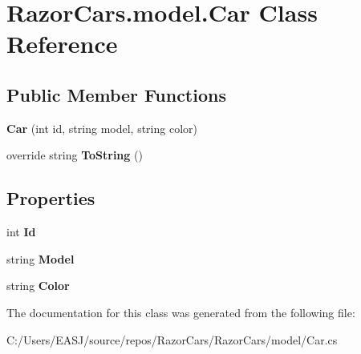 \hypertarget{class_razor_cars_1_1model_1_1_car}{}\section{Razor\+Cars.\+model.\+Car Class Reference}
\label{class_razor_cars_1_1model_1_1_car}
\subsection*{Public Member Functions}
\begin{DoxyCompactItemize}
\item 
\mbox{\label{class_razor_cars_1_1model_1_1_car_a8b5835ded0ebdb59deb31596c7bc76d0}} 
{\bfseries Car} (int id, string model, string color)
\item 
\mbox{\label{class_razor_cars_1_1model_1_1_car_a0a91577834328cd1b47ef43d2b24f696}} 
override string {\bfseries To\+String} ()
\end{DoxyCompactItemize}
\subsection*{Properties}
\begin{DoxyCompactItemize}
\item 
\mbox{\label{class_razor_cars_1_1model_1_1_car_a9d5018ab18358883dc6acb824cc9135a}} 
int {\bfseries Id}
\item 
\mbox{\label{class_razor_cars_1_1model_1_1_car_a8fed06a977dd9a8e195d73efb0080ed4}} 
string {\bfseries Model}
\item 
\mbox{\label{class_razor_cars_1_1model_1_1_car_ad46c4648039cc8c4a1265c4f693796e7}} 
string {\bfseries Color}
\end{DoxyCompactItemize}


The documentation for this class was generated from the following file\+:\begin{DoxyCompactItemize}
\item 
C\+:/\+Users/\+E\+A\+S\+J/source/repos/\+Razor\+Cars/\+Razor\+Cars/model/Car.\+cs\end{DoxyCompactItemize}
